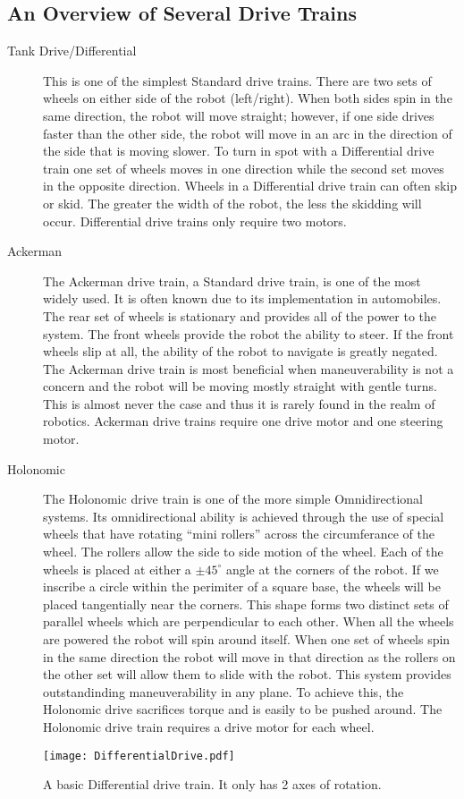 \documentclass[a4paper]{article}
\begin{document}
\subsection{An Overview of Several Drive Trains}
\begin{description}
\item[Tank Drive/Differential] This is one of the simplest Standard drive trains. There are two sets of wheels on either side of the robot (left/right). When both sides spin in the same direction, the robot will move straight; however, if one side drives faster than the other side, the robot will move in an arc in the direction of the side that is moving slower. To turn in spot with a Differential drive train one set of wheels moves in one direction while the second set moves in the opposite direction. Wheels in a Differential drive train can often skip or skid. The greater the width of the robot, the less the skidding will occur. Differential drive trains only require two motors. 
\item[Ackerman] The Ackerman drive train, a Standard drive train, is one of the most widely used. It is often known due to its implementation in automobiles. The rear set of wheels is stationary and provides all of the power to the system. The front wheels provide the robot the ability to steer. If the front wheels slip at all, the ability of the robot to navigate is greatly negated. The Ackerman drive train is most beneficial when maneuverability is not a concern and the robot will be moving mostly straight with gentle turns. This is almost never the case and thus it is rarely found in the realm of robotics. Ackerman drive trains require one drive motor and one steering motor. 
\item[Holonomic] The Holonomic drive train is one of the more simple Omnidirectional systems. Its omnidirectional ability is achieved through the use of special wheels that have rotating ``mini rollers'' across the circumferance of the wheel. The rollers allow the side to side motion of the wheel. Each of the wheels is placed at either a $\pm 45^\circ$ angle at the corners of the robot. If we inscribe a circle within the perimiter of a square base, the wheels will be placed tangentially near the corners. This shape forms two distinct sets of parallel wheels which are perpendicular to each other. When all the wheels are powered the robot will spin around itself. When one set of wheels spin in the same direction the robot will move in that direction as the rollers on the other set will allow them to slide with the robot. This system provides outstandinding maneuverability in any plane. To achieve this, the Holonomic drive sacrifices torque and is easily to be pushed around. The Holonomic drive train requires a drive motor for each wheel. 
\end{description}
\begin{figure}%
\begin{center}
\texttt{[image: DifferentialDrive.pdf]}
\end{center}
\caption{A basic Differential drive train. It only has 2 axes of rotation.}%
\label{DiffDrive}%
\end{figure}
\end{document}

